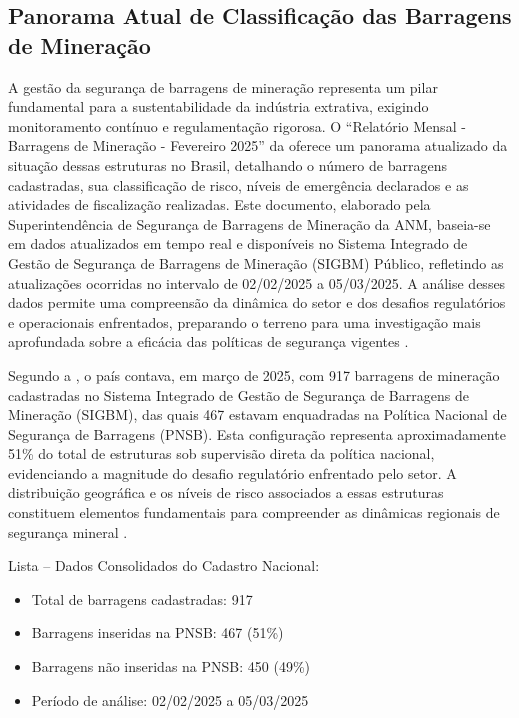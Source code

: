 \subsection{Panorama Atual de Classificação das Barragens de Mineração}

A gestão da segurança de barragens de mineração representa um pilar fundamental para a sustentabilidade da indústria extrativa, exigindo monitoramento contínuo e regulamentação rigorosa. O ``Relatório Mensal - Barragens de Mineração - Fevereiro 2025'' da  oferece um panorama atualizado da situação dessas estruturas no Brasil, detalhando o número de barragens cadastradas, sua classificação de risco, níveis de emergência declarados e as atividades de fiscalização realizadas. Este documento, elaborado pela Superintendência de Segurança de Barragens de Mineração da ANM, baseia-se em dados atualizados em tempo real e disponíveis no Sistema Integrado de Gestão de Segurança de Barragens de Mineração (SIGBM) Público, refletindo as atualizações ocorridas no intervalo de 02/02/2025 a 05/03/2025. A análise desses dados permite uma compreensão da dinâmica do setor e dos desafios regulatórios e operacionais enfrentados, preparando o terreno para uma investigação mais aprofundada sobre a eficácia das políticas de segurança vigentes \cite{anm2025boletim}.

Segundo a , o país contava, em março de 2025, com 917 barragens de mineração cadastradas no Sistema Integrado de Gestão de Segurança de Barragens de Mineração (SIGBM), das quais 467 estavam enquadradas na Política Nacional de Segurança de Barragens (PNSB). Esta configuração representa aproximadamente 51\% do total de estruturas sob supervisão direta da política nacional, evidenciando a magnitude do desafio regulatório enfrentado pelo setor. A distribuição geográfica e os níveis de risco associados a essas estruturas constituem elementos fundamentais para compreender as dinâmicas regionais de segurança mineral \cite{anm2025boletim}.

Lista – Dados Consolidados do Cadastro Nacional:
\begin{itemize}
    \item Total de barragens cadastradas: 917
    \item Barragens inseridas na PNSB: 467 (51\%)
    \item Barragens não inseridas na PNSB: 450 (49\%)
    \item Período de análise: 02/02/2025 a 05/03/2025
\end{itemize}

